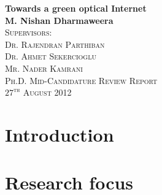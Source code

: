 \documentclass{article}
\begin{document}
\begin{titlepage}
\begin{center}
{\huge \bfseries Towards a green optical Internet}\\[2.5cm]
{\LARGE \bfseries M. Nishan Dharmaweera}\\[2.5cm]
\textsc{\Large Supervisors:\\[0.5cm] Dr. Rajendran Parthiban \\[0.4cm] Dr. Ahmet Sekercioglu \\[0.5cm] Mr. Nader Kamrani}\\[6.5cm]
\textsc{\Large Ph.D. Mid-Candidature Review Report}\\

\vfill
\textsc{\Large $27^{\text{th}}$ August 2012}
\end{center}
\end{titlepage}
\tableofcontents

\section{Introduction}


\section{Research focus}
\end{document}
